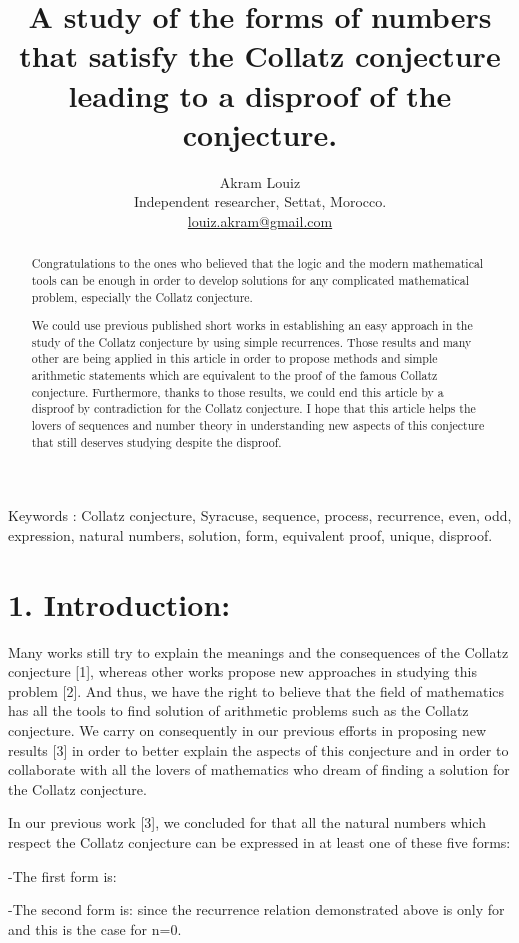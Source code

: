 \documentclass[11pt,a4paper]{article}
\title{A study of the forms of numbers that satisfy the Collatz conjecture leading to a disproof of the conjecture.}
\author{Akram Louiz\\[2pt] Independent researcher, Settat, Morocco.\\ \href{mailto:louiz.akram@gmail.com}{louiz.akram@gmail.com}}
\date{}
\newcommand{\fph}[1]{\mbox{\fbox{\scriptsize\textsf{formula~#1}}}}
\begin{document}
\maketitle
\begin{abstract}
Congratulations to the ones who believed that the logic and the modern mathematical tools can be enough in order to develop solutions for any complicated mathematical problem, especially the Collatz conjecture.

We could use previous published short works in establishing an easy approach in the study of the Collatz conjecture by using simple recurrences. Those results and many other are being applied in this article in order to propose methods and simple arithmetic statements which are equivalent to the proof of the famous Collatz conjecture. Furthermore, thanks to those results, we could end this article by a disproof by contradiction for the Collatz conjecture. I hope that this article helps the lovers of sequences and number theory in understanding new aspects of this conjecture that still deserves studying despite the disproof.
\end{abstract}
Keywords : Collatz conjecture, Syracuse, sequence, process, recurrence, even, odd, expression, natural numbers, solution, form, equivalent proof, unique, disproof.


\section*{1. Introduction:}

Many works still try to explain the meanings and the consequences of the Collatz conjecture [1], whereas other works propose new approaches in studying this problem [2]. And thus, we have the right to believe that the field of mathematics has all the tools to find solution of arithmetic problems such as the Collatz conjecture. We carry on consequently in our previous efforts in proposing new results [3] in order to better explain the aspects of this conjecture and in order to collaborate with all the lovers of mathematics who dream of finding a solution for the Collatz conjecture.

In our previous work [3], we concluded for \fph{1} that all the natural numbers \fph{2} which respect the Collatz conjecture can be expressed in at least one of these five forms:

-The first form is: \fph{3}

-The second form is: \fph{4} since the recurrence relation demonstrated above is only for and this is the case for n=0.
\end{document}
